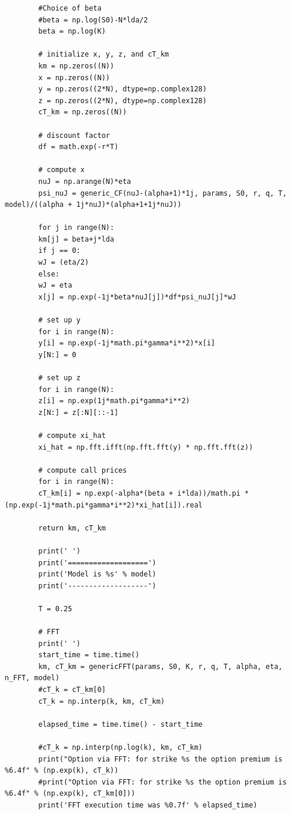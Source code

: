 \documentclass[letterpaper]{article}
\begin{document}
\begin{lstlisting}
       	#Choice of beta
       	#beta = np.log(S0)-N*lda/2
       	beta = np.log(K)
       	
       	# initialize x, y, z, and cT_km
       	km = np.zeros((N))
       	x = np.zeros((N))
       	y = np.zeros((2*N), dtype=np.complex128)
       	z = np.zeros((2*N), dtype=np.complex128)
       	cT_km = np.zeros((N)) 
       	
       	# discount factor
       	df = math.exp(-r*T)
       	
       	# compute x
       	nuJ = np.arange(N)*eta
       	psi_nuJ = generic_CF(nuJ-(alpha+1)*1j, params, S0, r, q, T, model)/((alpha + 1j*nuJ)*(alpha+1+1j*nuJ))
       	
       	for j in range(N):  
       	km[j] = beta+j*lda
       	if j == 0:
       	wJ = (eta/2)
       	else:
       	wJ = eta
       	x[j] = np.exp(-1j*beta*nuJ[j])*df*psi_nuJ[j]*wJ
       	
       	# set up y
       	for i in range(N):
       	y[i] = np.exp(-1j*math.pi*gamma*i**2)*x[i]
       	y[N:] = 0
       	
       	# set up z
       	for i in range(N):
       	z[i] = np.exp(1j*math.pi*gamma*i**2)
       	z[N:] = z[:N][::-1]
       	
       	# compute xi_hat
       	xi_hat = np.fft.ifft(np.fft.fft(y) * np.fft.fft(z))
       	
       	# compute call prices
       	for i in range(N):
       	cT_km[i] = np.exp(-alpha*(beta + i*lda))/math.pi * (np.exp(-1j*math.pi*gamma*i**2)*xi_hat[i]).real
       	
       	return km, cT_km
       	
       	print(' ')
       	print('===================')
       	print('Model is %s' % model)
       	print('-------------------')
       	
       	T = 0.25
       	
       	# FFT
       	print(' ')
       	start_time = time.time()
       	km, cT_km = genericFFT(params, S0, K, r, q, T, alpha, eta, n_FFT, model)
       	#cT_k = cT_km[0]
       	cT_k = np.interp(k, km, cT_km)
       	
       	elapsed_time = time.time() - start_time
       	
       	#cT_k = np.interp(np.log(k), km, cT_km)
       	print("Option via FFT: for strike %s the option premium is %6.4f" % (np.exp(k), cT_k))
       	#print("Option via FFT: for strike %s the option premium is %6.4f" % (np.exp(k), cT_km[0]))
       	print('FFT execution time was %0.7f' % elapsed_time)
       	

\end{lstlisting}
\end{document}
